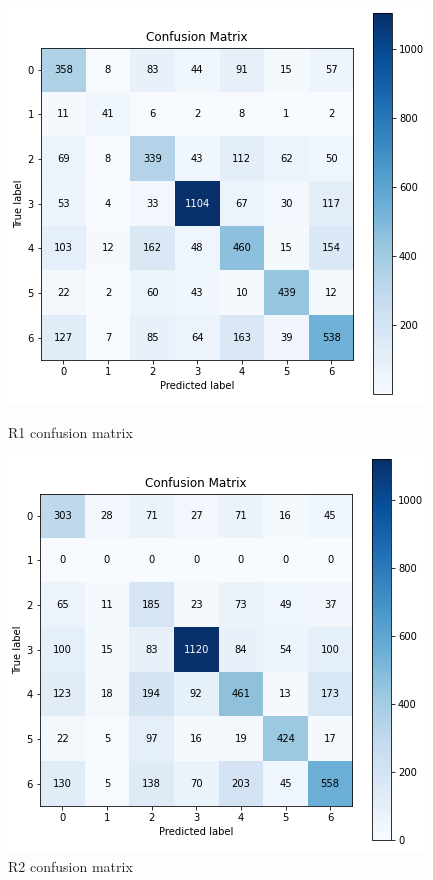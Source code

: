 \documentclass[target=mst]{thud}
\begin{document}
\begin{figure}[h!]
    \centering
    \begin{minipage}[b]{0.48\textwidth}
      \centering
      \includegraphics[scale=0.75]{R1_confusion_matrix.png}
      \caption{R1 confusion matrix}
      \label{fig:R1_confusion_matrix}
    \end{minipage}
    \begin{minipage}[b]{0.48\textwidth}
      \centering
      \includegraphics[scale=0.75]{R2_confusion_matrix.png}
      \caption{R2 confusion matrix}
      \label{fig:R2_confusion_matrix}
    \end{minipage}
\end{figure}
\end{document}
